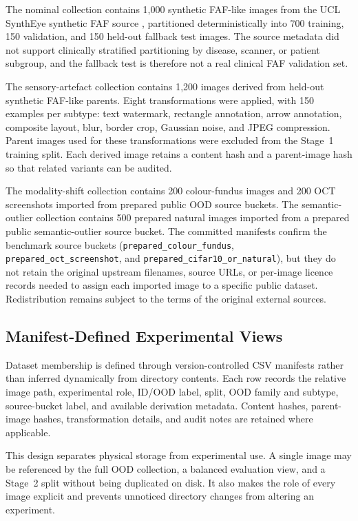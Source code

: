 \documentclass[fleqn,12pt]{olplainarticle}
\begin{document}
The nominal collection contains 1,000 synthetic FAF-like images from the UCL
SynthEye synthetic FAF source \cite{uclSyntheyeDataset2025}, partitioned
deterministically into 700 training, 150 validation, and 150 held-out fallback
test images. The source metadata did not support clinically stratified
partitioning by disease, scanner, or patient subgroup, and the fallback test is
therefore not a real clinical FAF validation set.

The sensory-artefact collection contains 1,200 images derived from held-out
synthetic FAF-like parents. Eight transformations were applied, with 150
examples per subtype: text watermark, rectangle annotation, arrow annotation,
composite layout, blur, border crop, Gaussian noise, and JPEG compression.
Parent images used for these transformations were excluded from the Stage~1
training split. Each derived image retains a content hash and a parent-image
hash so that related variants can be audited.

The modality-shift collection contains 200 colour-fundus images and 200 OCT
screenshots imported from prepared public OOD source buckets. The
semantic-outlier collection contains 500 prepared natural images imported from
a prepared public semantic-outlier source bucket. The committed manifests
confirm the benchmark source buckets
(\texttt{prepared\_colour\_fundus},
\texttt{prepared\_oct\_screenshot}, and
\texttt{prepared\_cifar10\_or\_natural}), but they do not retain the original
upstream filenames, source URLs, or per-image licence records needed to assign
each imported image to a specific public dataset. Redistribution remains
subject to the terms of the original external sources.

\subsection{Manifest-Defined Experimental Views}
\label{subsec:manifest_representation}

Dataset membership is defined through version-controlled CSV manifests rather
than inferred dynamically from directory contents. Each row records the
relative image path, experimental role, ID/OOD label, split, OOD family and
subtype, source-bucket label, and available derivation metadata. Content hashes,
parent-image hashes, transformation details, and audit notes are retained
where applicable.

This design separates physical storage from experimental use. A single image
may be referenced by the full OOD collection, a balanced evaluation view, and
a Stage~2 split without being duplicated on disk. It also makes the role of
every image explicit and prevents unnoticed directory changes from altering
an experiment.
\end{document}
